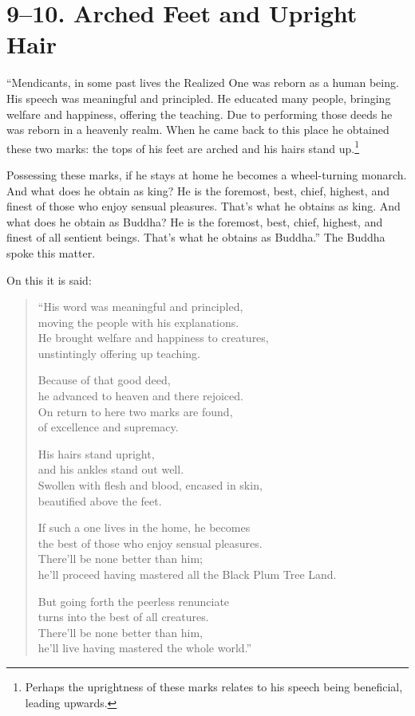 \documentclass[12pt,openany]{book}%
\begin{document}
\section*{9–10. Arched Feet and Upright Hair }

“Mendicants, in some past lives the Realized One was reborn as a human being. His speech was meaningful and principled. He educated many people, bringing welfare and happiness, offering the teaching. Due to performing those deeds he was reborn in a heavenly realm. When he came back to this place he obtained these two marks: the tops of his feet are arched and his hairs stand up.\footnote{Perhaps the uprightness of these marks relates to his speech being beneficial, leading upwards. } 

Possessing these marks, if he stays at home he becomes a wheel-turning monarch. And what does he obtain as king? He is the foremost, best, chief, highest, and finest of those who enjoy sensual pleasures. That’s what he obtains as king. And what does he obtain as Buddha? He is the foremost, best, chief, highest, and finest of all sentient beings. That’s what he obtains as Buddha.” The Buddha spoke this matter. 

On this it is said: 

\begin{verse}%
“His word was meaningful and principled, \\
moving the people with his explanations. \\
He brought welfare and happiness to creatures, \\
unstintingly offering up teaching. 

Because of that good deed, \\
he advanced to heaven and there rejoiced. \\
On return to here two marks are found, \\
of excellence and supremacy. 

His hairs stand upright, \\
and his ankles stand out well. \\
Swollen with flesh and blood, encased in skin, \\
beautified above the feet. 

If such a one lives in the home, he becomes \\
the best of those who enjoy sensual pleasures. \\
There’ll be none better than him; \\
he’ll proceed having mastered all the Black Plum Tree Land. 

But going forth the peerless renunciate \\
turns into the best of all creatures. \\
There’ll be none better than him, \\
he’ll live having mastered the whole world.” 

%
\end{verse}
\end{document}
